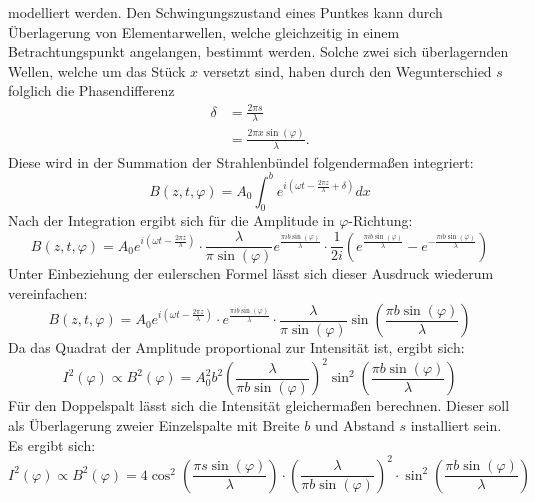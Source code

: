 modelliert werden. Den Schwingungszustand eines Puntkes kann durch Überlagerung 
von Elementarwellen, welche gleichzeitig in einem Betrachtungspunkt angelangen,
bestimmt werden. Solche zwei sich überlagernden Wellen, welche um das Stück $x$
versetzt sind, haben durch den Wegunterschied $s$ folglich die Phasendifferenz
\begin{align}
    \label{eqn:2}
    \delta &= \frac{2 \pi s}{\lambda} \\
    \label{eqn:3}
           &= \frac{2 \pi x \sin(\varphi)}{\lambda}.
\end{align}
\noindent Diese wird in der Summation der Strahlenbündel folgendermaßen integriert:
\begin{equation}
    \label{eqn:4}
    B(z,t,\varphi) = A_0 \int_0^b e^{i\left(\omega t - \frac{2 \pi z}{\lambda}
    + \delta\right)} dx
\end{equation}
\noindent Nach der Integration ergibt sich für die Amplitude in $\varphi$-Richtung:
\begin{equation}
    \label{eqn:5}
    B(z,t,\varphi) = A_0 e^{i\left(\omega t - \frac{2 \pi z}{\lambda}\right)}
    \cdot \frac{\lambda}{\pi \sin(\varphi)} e^{\frac{\pi i b \sin(\varphi)}{\lambda}}
    \cdot \frac{1}{2i} \left(e^{\frac{\pi i b \sin(\varphi)}{\lambda}}
    -e^{-\frac{\pi i b \sin(\varphi)}{\lambda}}\right)
\end{equation}
\noindent Unter Einbeziehung der eulerschen Formel lässt sich dieser Ausdruck
wiederum vereinfachen:
\begin{equation}
    \label{eqn:6}
    B(z,t,\varphi) = A_0 e^{i\left(\omega t - \frac{2 \pi z}{\lambda}\right)}
    \cdot e^{\frac{\pi i b \sin(\varphi)}{\lambda}} \cdot \frac{\lambda}{\pi \sin(\varphi)}
    \sin\left(\frac{\pi b \sin(\varphi)}{\lambda}\right)
\end{equation}
\noindent Da das Quadrat der Amplitude proportional zur Intensität ist, ergibt 
sich:
\begin{equation}
    \label{eqn:7}
    I^2 (\varphi) \propto B^2 (\varphi) = A_0^2 b^2 \left(\frac{\lambda}
    {\pi b \sin(\varphi)}\right)^2 \sin^2 \left(\frac{\pi b \sin(\varphi)}
    {\lambda}\right)
\end{equation}
Für den Doppelspalt lässt sich die Intensität gleichermaßen berechnen. Dieser 
soll als Überlagerung zweier Einzelspalte mit Breite $b$ und Abstand $s$ 
installiert sein. Es ergibt sich:
\begin{equation}
    \label{eqn:8}
    I^2 (\varphi) \propto B^2 (\varphi) = 4 \cos^2 \left(\frac{\pi s \sin(\varphi)}
    {\lambda}\right) \cdot \left(\frac{\lambda}{\pi b \sin(\varphi)}\right)^2
    \cdot \sin^2\left(\frac{\pi b \sin(\varphi)}{\lambda}\right)
\end{equation}


